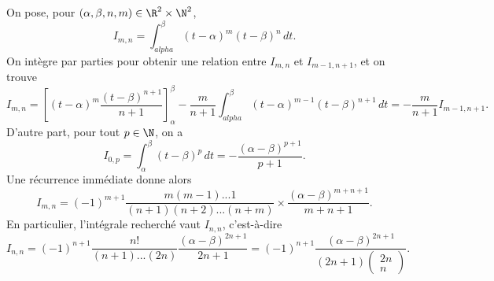 On pose, pour $(\alpha,\beta,n,m) \in \R^2 \times \N^2$, 
\[ I_{m,n}= \int_{alpha}^{\beta} (t-\alpha)^m(t-\beta)^n \,dt.\]
On intègre par parties pour obtenir une relation entre $I_{m,n}$ et $I_{m-1,n+1}$, et on trouve 
\[ I_{m,n}= \left[ (t-\alpha)^m \frac{(t-\beta)^{n+1}}{n+1} \right]_{\alpha}^{\beta} - \frac{m}{n+1} \int_{alpha}^{\beta} (t-\alpha)^{m-1} (t-\beta)^{n+1} \,dt = -\frac{m}{n+1} I_{m-1,n+1}.\]
D'autre part, pour tout $p \in \N$, on a \[ I_{0,p} = \int_{\alpha}^{\beta} (t-\beta)^p \, dt= -\frac{(\alpha- \beta)^{p+1}}{p+1}.\]
Une récurrence immédiate donne alors \[ I_{m,n} = (-1)^{m+1} \frac{m(m-1)...1}{(n+1)(n+2)...(n+m)} \times \frac{(\alpha - \beta)^{m+n+1}}{m+n+1}.\]
En particulier, l'intégrale recherché vaut $I_{n,n}$, c'est-à-dire 
\[I_{n,n}=(-1)^{n+1}\frac{n!}{(n+1)...(2n)}\frac{(\alpha-\beta)^{2n+1}}{2n+1} = (-1)^{n+1}\frac{(\alpha-\beta)^{2n+1}}{(2n+1) \begin{pmatrix}
2n \\ n
\end{pmatrix}}.\]